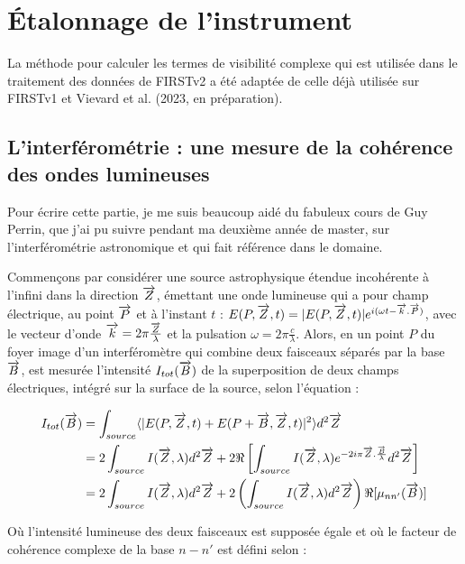 \section{Étalonnage de l'instrument}

La méthode pour calculer les termes de visibilité complexe qui est utilisée dans le traitement des données de \ac{FIRSTv2} a été adaptée de celle déjà utilisée sur \ac{FIRSTv1} \citep{huby2012, huby2013these} et Vievard et al. (2023, en préparation).

\subsection{L'interférométrie : une mesure de la cohérence des ondes lumineuses}

Pour écrire cette partie, je me suis beaucoup aidé du fabuleux cours de Guy Perrin, que j'ai pu suivre pendant ma deuxième année de master, sur l'interférométrie astronomique et qui fait référence dans le domaine.

Commençons par considérer une source astrophysique étendue incohérente à l'infini dans la direction $\overrightarrow{Z}$, émettant une onde lumineuse qui a pour champ électrique, au point $\overrightarrow{P}$ et à l'instant $t$ : $E(P,\overrightarrow{Z},t) = |E(P,\overrightarrow{Z},t)| e^{i(\omega t - \overrightarrow{k}.\overrightarrow{P})}$, avec le vecteur d'onde $\overrightarrow{k} = 2\pi \frac{\overrightarrow{Z}}{\lambda}$ et la pulsation $\omega = 2\pi \frac{c}{\lambda}$. Alors, en un point $P$ du foyer image d'un interféromètre qui combine deux faisceaux séparés par la base $\overrightarrow{B}$, est mesurée l'intensité $I_{tot}(\overrightarrow{B})$ de la superposition de deux champs électriques, intégré sur la surface de la source, selon l'équation :

\begin{align}
	I_{tot}(\overrightarrow{B}) &= \int_{source} \langle | E(P,\overrightarrow{Z},t) + E(P+\overrightarrow{B},\overrightarrow{Z},t) |^2 \rangle d^2\overrightarrow{Z} \label{eq:Interferogramme1} \\
	&= 2 \int_{source} I(\overrightarrow{Z},\lambda) d^2\overrightarrow{Z} + 2 \Re \left[\int_{source} I(\overrightarrow{Z},\lambda) e^{-2i\pi \overrightarrow{Z}.\frac{\overrightarrow{B}}{\lambda}} d^2\overrightarrow{Z} \right] \\
	&= 2 \int_{source} I(\overrightarrow{Z},\lambda) d^2\overrightarrow{Z} + 2 \left(\int_{source} I(\overrightarrow{Z},\lambda) d^2\overrightarrow{Z} \right) \Re [\mu_{nn'}(\overrightarrow{B})] \label{eq:Interferogramme3}
\end{align}

Où l'intensité lumineuse des deux faisceaux est supposée égale et où le facteur de cohérence complexe de la base $n-n'$ est défini selon :

